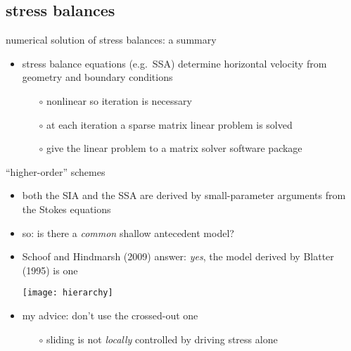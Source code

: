 \subsection{stress balances}

\begin{frame}{numerical solution of stress balances: a summary}

\begin{itemize}
\item stress balance equations (e.g.~SSA) determine horizontal velocity from geometry and boundary conditions
  \begin{itemize}
  \item[$\circ$] nonlinear so iteration is necessary
  \item[$\circ$] at each iteration a sparse matrix linear problem is solved
  \item[$\circ$] give the linear problem to a matrix solver software package
  \end{itemize}
\end{itemize}
\end{frame}


\begin{frame}{``higher-order'' schemes}

\begin{itemize}
\item both the SIA and the SSA are derived by small-parameter arguments from the Stokes equations
\item so: is there a \emph{common} shallow antecedent model?
\item Schoof and Hindmarsh (2009) answer:  \emph{yes}, the model derived by Blatter (1995) is one
\begin{center}
\texttt{[image: hierarchy]}
\end{center}
\item my advice: don't use the crossed-out one
  \begin{itemize}
  \item[$\circ$] sliding is not \emph{locally} controlled by driving stress alone
  \end{itemize}
\end{itemize}
\end{frame}


